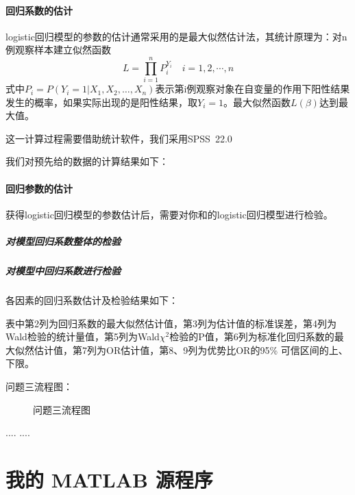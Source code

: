 \documentclass[bwprint]{cumcmthesis}
\begin{document}
\paragraph{回归系数的估计}
logistic回归模型的参数的估计通常采用的是最大似然估计法，其统计原理为：对n例观察样本建立似然函数\[ L=\prod_{i=1}^{n}P_{i}^{Y_{i}}\quad i=1,2,\cdots,n \]
式中$ P_{i} =P(Y_{i}=1|X_{1},X_{2},\ldots,X_{n})$表示第i例观察对象在自变量的作用下阳性结果发生的概率，如果实际出现的是阳性结果，取$ Y_{i}=1 $。最大似然函数$ L(\beta) $达到最大值。

这一计算过程需要借助统计软件，我们采用SPSS~22.0

我们对预先给的数据的计算结果如下：

\paragraph{回归参数的估计}
获得logistic回归模型的参数估计后，需要对你和的logistic回归模型进行检验。
\subparagraph{对模型回归系数整体的检验}
\subparagraph{对模型中回归系数进行检验}
各因素的回归系数估计及检验结果如下：

表中第2列为回归系数的最大似然估计值，第3列为估计值的标准误差，第4列为Wald检验的统计量值，第5列为Wald$ \chi^{2} $检验的P值，第6列为标准化回归系数的最大似然估计值，第7列为OR估计值，第8、9列为优势比OR的95\% 可信区间的上、下限。

问题三流程图：
\begin{figure}[!h]
\centering
\caption{问题三流程图}
\end{figure}
\begin{thebibliography}{9}
  ....
  ....
\end{thebibliography}
\appendix
\section{我的 MATLAB 源程序}
\end{document}
